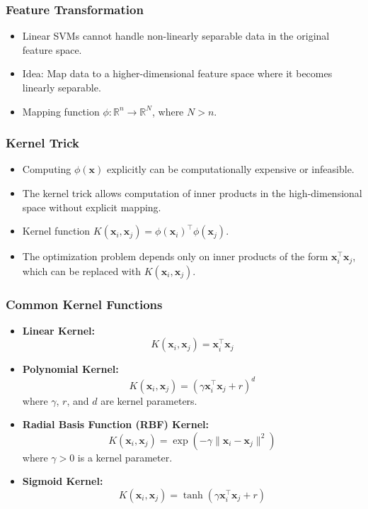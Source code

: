 \documentclass{article}
\begin{document}
\subsubsection{Feature Transformation}

\begin{itemize}
    \item Linear SVMs cannot handle non-linearly separable data in the original feature space.
    \item Idea: Map data to a higher-dimensional feature space where it becomes linearly separable.
    \item Mapping function $\phi: \mathbb{R}^n \rightarrow \mathbb{R}^N$, where $N > n$.
\end{itemize}

\subsubsection{Kernel Trick}

\begin{itemize}
    \item Computing $\phi(\mathbf{x})$ explicitly can be computationally expensive or infeasible.
    \item The kernel trick allows computation of inner products in the high-dimensional space without explicit mapping.
    \item Kernel function $K(\mathbf{x}_i, \mathbf{x}_j) = \phi(\mathbf{x}_i)^\top \phi(\mathbf{x}_j)$.
    \item The optimization problem depends only on inner products of the form $\mathbf{x}_i^\top \mathbf{x}_j$, which can be replaced with $K(\mathbf{x}_i, \mathbf{x}_j)$.
\end{itemize}

\subsubsection{Common Kernel Functions}

\begin{itemize}
    \item \textbf{Linear Kernel:}
    \[
    K(\mathbf{x}_i, \mathbf{x}_j) = \mathbf{x}_i^\top \mathbf{x}_j
    \]
    \item \textbf{Polynomial Kernel:}
    \[
    K(\mathbf{x}_i, \mathbf{x}_j) = (\gamma \mathbf{x}_i^\top \mathbf{x}_j + r)^d
    \]
    where $\gamma$, $r$, and $d$ are kernel parameters.
    \item \textbf{Radial Basis Function (RBF) Kernel:}
    \[
    K(\mathbf{x}_i, \mathbf{x}_j) = \exp\left( -\gamma \| \mathbf{x}_i - \mathbf{x}_j \|^2 \right)
    \]
    where $\gamma > 0$ is a kernel parameter.
    \item \textbf{Sigmoid Kernel:}
    \[
    K(\mathbf{x}_i, \mathbf{x}_j) = \tanh(\gamma \mathbf{x}_i^\top \mathbf{x}_j + r)
    \]
\end{itemize}
\end{document}
